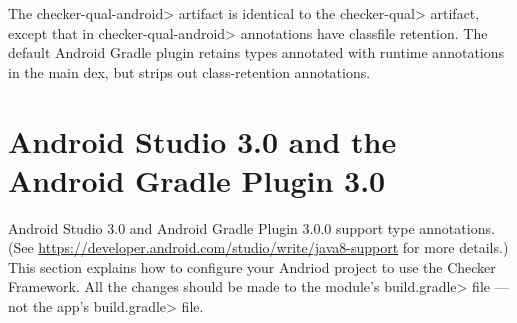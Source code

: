 The \<checker-qual-android> artifact is identical to the \<checker-qual>
artifact, except that in \<checker-qual-android> annotations have classfile
retention.  The default Android Gradle plugin retains types annotated with
runtime annotations in the main dex, but strips out class-retention
annotations.


\section{Android Studio 3.0 and the Android Gradle Plugin 3.0\label{android-gradle}}

Android Studio 3.0 and Android Gradle Plugin 3.0.0 support type
annotations.  (See
\url{https://developer.android.com/studio/write/java8-support}
for more details.)  This section explains how to configure your Andriod
project to use the Checker Framework.  All the changes should be made to
the module's \<build.gradle> file --- not the app's \<build.gradle> file.

